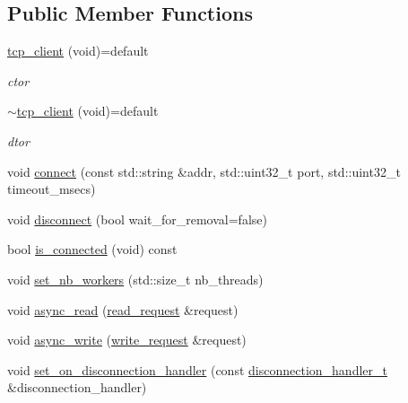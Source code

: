 \subsection*{Public Member Functions}
\begin{DoxyCompactItemize}
\item 
\mbox{\label{classcpp__redis_1_1network_1_1tcp__client_a8cbad07ca636e9d60dafc0e5cac8106d}} 
\hyperlink{classcpp__redis_1_1network_1_1tcp__client_a8cbad07ca636e9d60dafc0e5cac8106d}{tcp\+\_\+client} (void)=default
\begin{DoxyCompactList}\small\item\em ctor \end{DoxyCompactList}\item 
\mbox{\label{classcpp__redis_1_1network_1_1tcp__client_af859036bbc7e5ec9149c1410a1a66f09}} 
\hyperlink{classcpp__redis_1_1network_1_1tcp__client_af859036bbc7e5ec9149c1410a1a66f09}{$\sim$tcp\+\_\+client} (void)=default
\begin{DoxyCompactList}\small\item\em dtor \end{DoxyCompactList}\item 
void \hyperlink{classcpp__redis_1_1network_1_1tcp__client_a5808c0569980d83479f755ac55a12dfb}{connect} (const std\+::string \&addr, std\+::uint32\+\_\+t port, std\+::uint32\+\_\+t timeout\+\_\+msecs)
\item 
void \hyperlink{classcpp__redis_1_1network_1_1tcp__client_a88f49c4e32d59855a62296fb74136a44}{disconnect} (bool wait\+\_\+for\+\_\+removal=false)
\item 
bool \hyperlink{classcpp__redis_1_1network_1_1tcp__client_a0a636ca6bd59425bf22416a1c7694f65}{is\+\_\+connected} (void) const
\item 
void \hyperlink{classcpp__redis_1_1network_1_1tcp__client_aa56fc49540d67c5c05b3dda3aaff8a0f}{set\+\_\+nb\+\_\+workers} (std\+::size\+\_\+t nb\+\_\+threads)
\item 
void \hyperlink{classcpp__redis_1_1network_1_1tcp__client_a5eed4225fcd01e3108580d863c94c2cc}{async\+\_\+read} (\hyperlink{structcpp__redis_1_1network_1_1tcp__client__iface_1_1read__request}{read\+\_\+request} \&request)
\item 
void \hyperlink{classcpp__redis_1_1network_1_1tcp__client_a6d15785b71776cd85426c9634cb446f0}{async\+\_\+write} (\hyperlink{structcpp__redis_1_1network_1_1tcp__client__iface_1_1write__request}{write\+\_\+request} \&request)
\item 
void \hyperlink{classcpp__redis_1_1network_1_1tcp__client_a24ccdf6dc467aac13cb832a395adb38d}{set\+\_\+on\+\_\+disconnection\+\_\+handler} (const \hyperlink{classcpp__redis_1_1network_1_1tcp__client__iface_a9a7d5942205db8be03da581a848b8ec0}{disconnection\+\_\+handler\+\_\+t} \&disconnection\+\_\+handler)
\end{DoxyCompactItemize}

